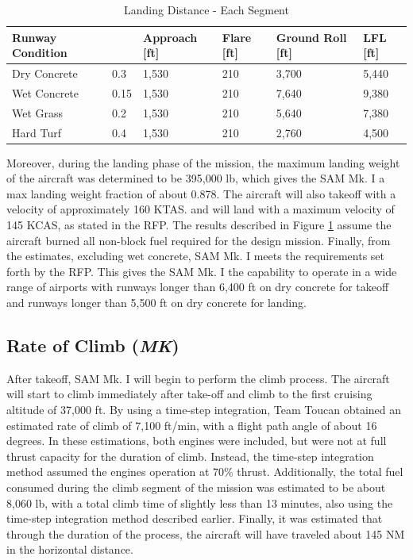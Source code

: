 \begin{table}[!h]
    \centering
    \caption{Landing Distance - Each Segment}
    \begin{tabular}{|p{1.1in}|p{.3in}|p{.8in}|p{.6in}|p{1.0in}|p{.55in}|}\toprule 
    \textbf{Runway Condition} & \boldmath{$\mu$} \textbf{\cite{raymer}} & \textbf{Approach [ft]} & \textbf{Flare [ft]} & \textbf{Ground Roll [ft]} & \textbf{LFL [ft]} \\ \hline \hline
    Dry Concrete & 0.3 & 1,530 & 210 & 3,700 & 5,440  \\ \hline
    Wet Concrete & 0.15 & 1,530 & 210 & 7,640 & 9,380\\ \hline
    Wet Grass & 0.2 & 1,530 & 210 & 5,640 & 7,380\\ \hline
    Hard Turf & 0.4 & 1,530 & 210 & 2,760 & 4,500\\ \bottomrule
    \end{tabular}
    \label{tab:land}
\end{table}

Moreover, during the landing phase of the mission, the maximum landing weight of the aircraft was determined to be 395,000 lb, which gives the SAM Mk. I a max landing weight fraction of about 0.878. The aircraft will also takeoff with a velocity of approximately 160 KTAS. and will land with a maximum velocity of 145 KCAS, as stated in the RFP. The results described in Figure \ref{tab:land} assume the aircraft burned all non-block fuel required for the design mission. Finally, from the estimates, excluding wet concrete, SAM Mk. I meets the requirements set forth by the RFP. This gives the SAM Mk. I the capability to operate in a wide range of airports with runways longer than 6,400 ft on dry concrete for takeoff and runways longer than 5,500 ft on dry concrete for landing.

\subsection{Rate of Climb (\textit{MK})}
After takeoff, SAM Mk. I will begin to perform the climb process. The aircraft will start to climb immediately after take-off and climb to the first cruising altitude of 37,000 ft. By using a time-step integration, Team Toucan obtained an estimated rate of climb of 7,100 ft/min, with a flight path angle of about 16 degrees. In these estimations, both engines were included, but were not at full thrust capacity for the duration of climb. Instead, the time-step integration method assumed the engines operation at 70\% thrust. Additionally, the total fuel consumed during the climb segment of the mission was estimated to be about 8,060 lb, with a total climb time of slightly less than 13 minutes, also using the time-step integration method described earlier. Finally, it was estimated that through the duration of the process, the aircraft will have traveled about 145 NM in the horizontal distance.

